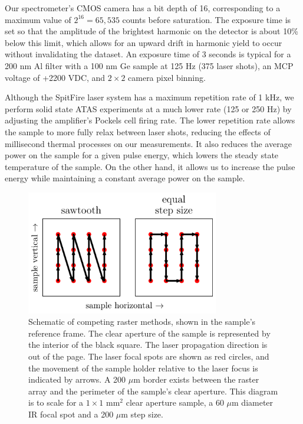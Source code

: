 Our spectrometer's CMOS camera has a bit depth of 16, corresponding to a maximum value of $2^{16} = 65,535$ counts before saturation. The exposure time is set so that the amplitude of the brightest harmonic on the detector is about 10\% below this limit, which allows for an upward drift in harmonic yield to occur without invalidating the dataset. An exposure time of 3 seconds is typical for a 200 nm Al filter with a 100 nm Ge sample at 125 Hz (375 laser shots), an MCP voltage of +2200 VDC, and $2 \times 2$ camera pixel binning.

Although the SpitFire laser system has a maximum repetition rate of 1 kHz, we perform solid state ATAS experiments at a much lower rate (125 or 250 Hz) by adjusting the amplifier's Pockels cell firing rate. The lower repetition rate allows the sample to more fully relax between laser shots, reducing the effects of millisecond thermal processes on our measurements. It also reduces the average power on the sample for a given pulse energy, which lowers the steady state temperature of the sample. On the other hand, it allows us to increase the pulse energy while maintaining a constant average power on the sample.

\begin{figure}
	\centering
	\includegraphics[width=0.75\textwidth]{figures/chap4/rastering_methods.pdf}
	\caption{Schematic of competing raster methods, shown in the sample's reference frame. The clear aperture of the sample is represented by the interior of the black square. The laser propagation direction is out of the page. The laser focal spots are shown as red circles, and the movement of the sample holder relative to the laser focus is indicated by arrows. A 200 $\mu$m border exists between the raster array and the perimeter of the sample's clear aperture. This diagram is to scale for a $1\times1$ mm$^2$ clear aperture sample, a 60 $\mu$m diameter IR focal spot and a 200 $\mu$m step size.}
	\label{fig:Rastering_Methods}
\end{figure}

